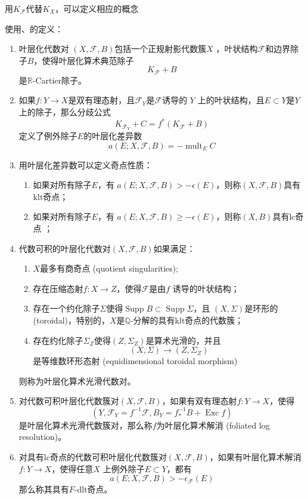 用$K_{\mathcal{F}}$代替$K_{X}$，可以定义相应的概念
\begin{definition}
使用\cite[3.4.5,6.2.1]{chlx}、\cite[3.2]{acss}的定义：
  \begin{enumerate}
    \item 叶层化代数对 $(X,\mathcal{F},B)$包括一个正规射影代数簇$X$ ，叶状结构$\mathcal{F}$和边界除子$B$，使得叶层化算术典范除子
  \[ K_{\mathcal{F}}+B \]
  是$\mathbb{R}$-Cartier除子。
    \item 如果$f:Y\to X$是双有理态射，且$\mathcal{F}_{Y} $是$\mathcal{F} $诱导的 $Y$ 上的叶状结构，且$E \subset Y$是$Y$ 上的除子，那么分歧公式
  \[ K_{\mathcal{F}_{Y}}+C=f^{*}(K_{\mathcal{F}}+B) \]
  定义了例外除子$E$的叶层化差异数
  \[ a(E;X,\mathcal{F},B)=- \operatorname{mult}_{E}C \]
    \item 用叶层化差异数可以定义奇点性质：
      \begin{enumerate}
        \item 如果对所有除子$E$，有 $a(E;X,\mathcal{F},B)>-\epsilon(E)$，则称$(X,\mathcal{F},B) $具有klt奇点；
        \item 如果对所有除子$E$，有 $a(E;X,\mathcal{F},B)\geqslant -\epsilon(E)$，则称$(X,B) $具有lc奇点 ；
      \end{enumerate}
    \item 代数可积的叶层化代数对$(X,\mathcal{F},B)$如果满足：
      \begin{enumerate}
        \item $X$最多有商奇点 (quotient singularities);
        \item 存在压缩态射$f:X\to Z$，使得$\mathcal{F}$是由$f$ 诱导的叶状结构； 
        \item 存在一个约化除子$\Sigma$使得$\operatorname{Supp}B \subset \operatorname{Supp} \Sigma $，且 $(X,\Sigma)$是环形的 (toroidal)，特别的，$X$是$\mathbb{Q}$-分解的具有klt奇点的代数簇；
        \item 存在约化除子$\Sigma_{Z}$使得$ (Z,\Sigma_{Z})$是算术光滑的，并且
          \[ (X,\Sigma)\to (Z,\Sigma_{Z}) \]
          是等维数环形态射 (equidimensional toroidal morphism)
      \end{enumerate}
      则称为叶层化算术光滑代数对。
    \item 对代数可积叶层化代数簇对$(X,\mathcal{F},B)$，如果有双有理态射$f:Y\to X$，使得
      \[ (Y,\mathcal{F}_{Y}=f^{-1}\mathcal{F},B_{Y}=f^{-1}_{*}B+ \operatorname{Exc}f) \]
      是叶层化算术光滑代数簇对，那么称$f$为叶层化算术解消 (foliated log resolution)。
    \item 对具有lc奇点的代数可积叶层化代数簇对$(X,\mathcal{F},B)$，如果有叶层化算术解消$f:Y\to X$，使得任意$X$ 上例外除子$E \subset Y$，都有
      \[ a(E;X,\mathcal{F},B)>-\epsilon_{\mathcal{F}}(E) \]
      那么称其具有$F$-dlt奇点。
  \end{enumerate}
\end{definition}
